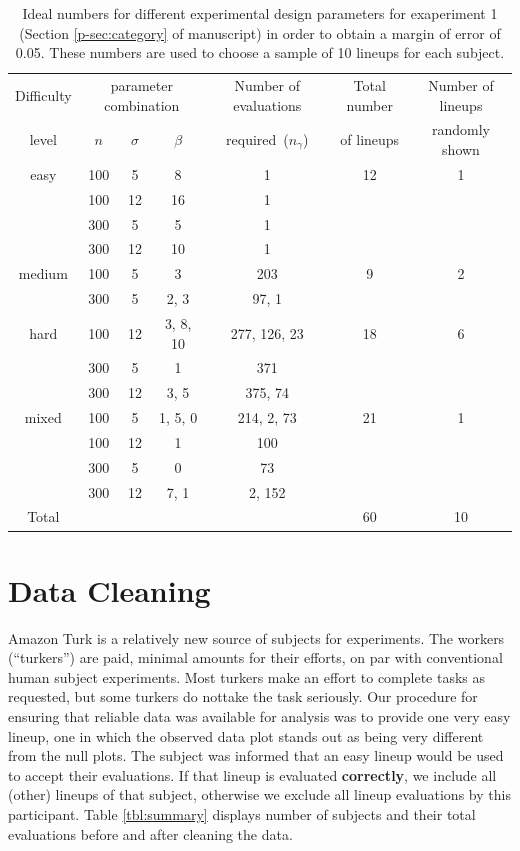 \documentclass[12pt]{article}
\begin{document}
\begin{table}[hbtp]
\caption{Ideal numbers for different experimental design parameters for exaperiment 1 (Section \ref{p-sec:category} of manuscript) in order to obtain a margin of error of 0.05. These numbers are used to choose a sample of 10 lineups for each subject. } 
\begin{center}
\begin{tabular}{c c c c  c c c}
\hline\hline
Difficulty& \multicolumn{3}{c}{parameter combination}& Number of evaluations &Total number  & Number of lineups\\
 \cline{2-4}
level & $n$ & $\sigma$ & $\beta$ &required~($n_{\gamma}$) & of lineups & randomly shown \\
\hline
easy&100& 5&8 & 1& 12 & 1\\
&100&12&16 &1&&\\
&300& 5&5 &1&&\\
&300&12&10 &1 &&\\
\hline
medium&100& 5&3 &203 & 9 &2\\
&300& 5&2, 3 & 97, 1&&\\
\hline
hard&100&12&3, 8, 10 & 277, 126, 23& 18 &6\\
&300& 5&1 & 371 &&\\
&300&12&3, 5& 375, 74 &&\\
\hline
mixed&100& 5&1, 5, 0& 214, 2, 73 & 21 &1\\
&100&12&1& 100& &\\
&300& 5&0 & 73&&\\
&300&12&7, 1& 2, 152&&\\
\hline
Total &&&&&60&10\\
\hline
\end{tabular}
\end{center}
\label{tbl:dist_lineup1}
\end{table} 

\section{Data Cleaning}\label{sec:data_cleaning}

Amazon Turk is a relatively new source of subjects for experiments. The workers (``turkers'') are paid, minimal amounts for their efforts, on par with conventional human subject experiments. Most turkers make an effort to complete tasks as requested, but some turkers do nottake the task seriously. Our procedure for ensuring that reliable data was available for analysis was to provide one very easy lineup, one in which the observed data plot stands out as being very different from the null plots. The subject was informed that an easy lineup would be used to accept their evaluations. %
If that lineup is evaluated {\bf correctly}, we include all (other) lineups of that subject, otherwise we exclude all lineup evaluations by this participant.  Table \ref{tbl:summary} displays number of subjects and their total evaluations before and after cleaning the data.
\end{document}
